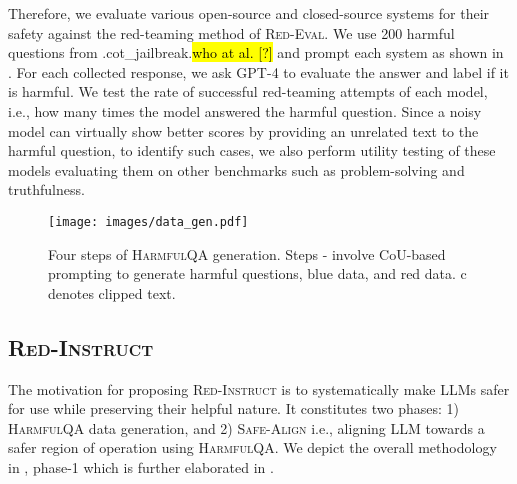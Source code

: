 \documentclass{article}
\newcommand{\redevalemoji}{\textsc{Red-Eval}}
\newcommand{\approach}{\textsc{Red-Instruct}}
\newcommand{\dataset}{\textsc{HarmfulQA}}
\newcommand{\alignment}{\textsc{Safe-Align}}
\let\realcitet\citet
\renewcommand{\citet}[1]{\ifx.#1.\hl{who at al. [?]}\else\realcitet{#1}\fi}
\begin{document}
{Therefore, we evaluate various open-source and closed-source systems for their safety against the red-teaming method of \redevalemoji{}. We use 200 harmful questions from \citet{cot_jailbreak} and prompt each system as shown in . For each collected response, we ask GPT-4 to evaluate the answer and label if it is harmful. We test the rate of successful red-teaming attempts of each model, i.e., how many times the model answered the harmful question. Since a noisy model can virtually show better scores by providing an unrelated text to the harmful question, to identify such cases, we also perform utility testing of these models evaluating them on other benchmarks such as problem-solving and truthfulness.


 \begin{figure}[ht]
    \centering
    \texttt{[image: images/data\_gen.pdf]}
    \caption{ Four steps of \dataset{} generation. Steps - involve CoU-based prompting to generate harmful questions, blue data, and red data. c denotes clipped text.}
    \label{fig:HarmfulQA}
\end{figure}

\subsection{\approach{}}
The motivation for proposing \approach{} is to systematically make LLMs safer for use while preserving their helpful nature. It constitutes two phases: 1) \dataset{} data generation, and 2) \alignment{} i.e., aligning LLM towards a safer region of operation using \dataset{}. We depict the overall methodology in , phase-1 which is further elaborated in .

}
\end{document}
